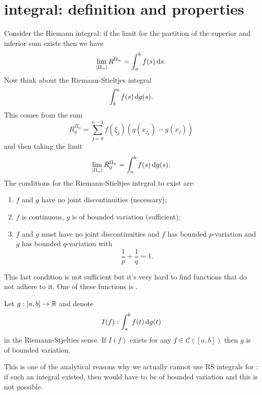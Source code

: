 \documentclass[12pt]{report}
\begin{document}
\section{\ito{} integral: definition and properties}
Consider the Riemann integral: if the limit for the partition of the superior and inferior sum exists then we have
\begin{equation*}
	\lim_{|\Pi_{n}|}R^{\Pi_{n}}=\int_{a}^{b}f(s)\mathop{}\!\mathrm{d} s.
\end{equation*}
Now think about the Riemann-Stieltjes integral
\begin{equation*}
	\int_{b}^{a}f(s)\mathop{}\!\mathrm{d} g(s).
\end{equation*}
This comes from the sum
\begin{equation*}
	R^{\Pi_{n}}_{g}=\sum_{j=0}^{n-1}f(\xi_{j})(g(x_{j_1})-g(x_{j}))
\end{equation*}
and then taking the limit
\begin{equation*}
	\lim_{|\Pi_{n}|}R_{g}^{\Pi_{n}}=\int_{a}^{b}f(s)\mathop{}\!\mathrm{d} g(s).
\end{equation*}
The conditions for the Riemann-Stieltjes integral to exist are:
\begin{enumerate}
	\item $f$ and $g$ have no joint discontinuities (necessary);
	\item $f$ is continuous, $g$ is of bounded variation (sufficient);
	\item $f$ and $g$ must have no joint discontinuities and $f$ has bounded $p$-variation and $g$ has bounded $q$-variation with
	\begin{equation*}
		\frac{1}{p}+\frac{1}{q}=1.
	\end{equation*}
\end{enumerate}
This last condition is not sufficient but it's very hard to find functions that do not adhere to it. One of these functions is \bwm.
\begin{proposition}
	Let $g:[a,b]\to\mathbb{R}$ and denote
	\begin{equation*}
		I(f):\int_{a}^{b}f(t)\mathop{}\!\mathrm{d} g(t)
	\end{equation*}
	in the Riemann-Stjelties sense. If $I(f)$ exists for any $f\in\mathcal{C}([a,b])$ then $g$ is of bounded variation.
\end{proposition}
This is one of the analytical reasons why we actually cannot use RS integrals for \bwm: if such an integral existed, then \bwm{} would have to be of bounded variation and this is not possible.
\end{document}
